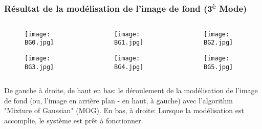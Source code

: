 \documentclass{beamer}
\begin{document}
\begin{frame}
\frametitle{Résultat de la modélisation de l'image de fond (3\textsuperscript{è} Mode)}

\begin{columns}
\begin{column}{0.33\textwidth}
\begin{figure}
\begin{center}
    \texttt{[image: BG0.jpg]}

    \vspace{0.4cm}

    \texttt{[image: BG3.jpg]}
\end{center}
\end{figure}
\end{column}

\begin{column}{0.33\textwidth}
\begin{figure}
\begin{center}
    \texttt{[image: BG1.jpg]}

    \vspace{0.4cm}

    \texttt{[image: BG4.jpg]}
\end{center}
\end{figure}
\end{column}

\begin{column}{0.33\textwidth}
\begin{figure}
\begin{center}
    \texttt{[image: BG2.jpg]}
    
    \vspace{0.4cm}

    \texttt{[image: BG5.jpg]}
\end{center}
\end{figure}
\end{column}
\end{columns}
\medskip
De gauche à droite, de haut en bas: le déroulement de la modélisation  de l'image de fond (ou, l'image en arrière plan - en haut, à gauche) avec l'algorithm "Mixture of Gaussian" (MOG).
En bas, à droite: Lorsque la modélisation est accomplie, le système est prêt à fonctionner.
\end{frame}
\end{document}
